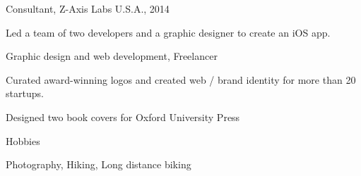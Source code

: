 


\begin{cventries}


\cventry
{} %
{Consultant, Z-Axis Labs} %
{U.S.A., 2014} %
{} %
{ %
\begin{cvitems}
\item {Led a team of two developers and a graphic designer to create an iOS app.}
\end{cvitems}
}


\cventry
{} %
{Graphic design and web development, Freelancer} %
{} %
{} %
{ %
\begin{cvitems}
\item {Curated award-winning logos and created web / brand identity for more than 20 startups.}
\item {Designed two book covers for Oxford University Press}
\end{cvitems}
}


\cventry
{} %
{Hobbies} %
{} %
{} %
{ %
\begin{cvitems}
\item {Photography, Hiking, Long distance biking}
\end{cvitems}
}

\end{cventries}
